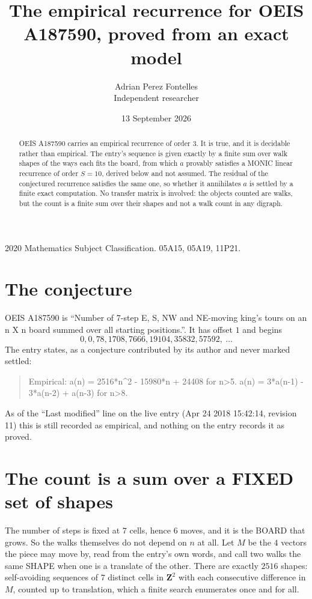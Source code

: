 \documentclass[11pt,a4paper]{article}
\title{The empirical recurrence for OEIS A187590, proved from an exact model}
\author{Adrian Perez Fontelles\\ \small Independent researcher}
\date{13 September 2026}
\theoremstyle{plain}
\theoremstyle{definition}
\begin{document}
\maketitle

\begin{abstract}
OEIS A187590 carries an empirical recurrence of order $3$. It is true, and it is
decidable rather than empirical. The entry's sequence is given exactly by a finite sum over walk shapes of the ways each fits the board, from
which $a$ provably satisfies a MONIC linear recurrence of order $S=10$, derived below and not
assumed. The residual of the conjectured recurrence satisfies the same one, so whether it
annihilates $a$ is settled by a finite exact computation. No transfer matrix is involved: the objects counted are walks, but the count is a finite sum over their shapes and not a walk count in any digraph.
\end{abstract}

\noindent\small 2020 Mathematics Subject Classification. 05A15, 05A19, 11P21.\normalsize

\section{The conjecture}

OEIS A187590 is ``Number of 7-step E, S, NW and NE-moving king's tours on an n X n board summed over all starting positions.''. It has offset $1$ and begins
\[
0, 0, 78, 1708, 7666, 19104, 35832, 57592,\ \dots
\]
The entry states, as a conjecture contributed by its author and never marked settled:
\begin{quote}
Empirical: a(n) = 2516*n\^{}2 - 15980*n + 24408 for n>5. a(n) = 3*a(n-1) - 3*a(n-2) + a(n-3) for n>8.
\end{quote}
As of the ``Last modified'' line on the live entry (Apr 24 2018 15:42:14, revision 11)
this is still recorded as empirical, and nothing on the entry records it as proved.

\section{The count is a sum over a FIXED set of shapes}

The number of steps is fixed at $7$ cells, hence $6$ moves, and it is the BOARD
that grows. So the walks themselves do not depend on $n$ at all. Let $M$ be the $4$
vectors the piece may move by, read from the entry's own words, and call two walks the same
SHAPE when one is a translate of the other. There are exactly $2516$ shapes: self-avoiding
sequences of $7$ distinct cells in $\mathbf{Z}^{2}$ with each consecutive difference in
$M$, counted up to translation, which a finite search enumerates once and for all.
\end{document}
